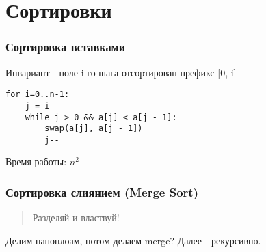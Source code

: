 \hypertarget{ux441ux43eux440ux442ux438ux440ux43eux432ux43aux438}{%
\section{Сортировки}\label{ux441ux43eux440ux442ux438ux440ux43eux432ux43aux438}}

\hypertarget{ux441ux43eux440ux442ux438ux440ux43eux432ux43aux430-ux432ux441ux442ux430ux432ux43aux430ux43cux438}{%
\subsubsection{Сортировка
вставками}\label{ux441ux43eux440ux442ux438ux440ux43eux432ux43aux430-ux432ux441ux442ux430ux432ux43aux430ux43cux438}}

Инвариант - поле i-го шага отсортирован префикс {[}0, i{]}

\begin{verbatim}
for i=0..n-1:
    j = i
    while j > 0 && a[j] < a[j - 1]:
        swap(a[j], a[j - 1])
        j--
\end{verbatim}

Время работы: \(n^2\)

\hypertarget{ux441ux43eux440ux442ux438ux440ux43eux432ux43aux430-ux441ux43bux438ux44fux43dux438ux435ux43c-merge-sort}{%
\subsubsection{Сортировка слиянием (Merge
Sort)}\label{ux441ux43eux440ux442ux438ux440ux43eux432ux43aux430-ux441ux43bux438ux44fux43dux438ux435ux43c-merge-sort}}

\begin{quote}
Разделяй и властвуй!
\end{quote}

Делим напоплоам, потом делаем merge? Далее - рекурсивно.


